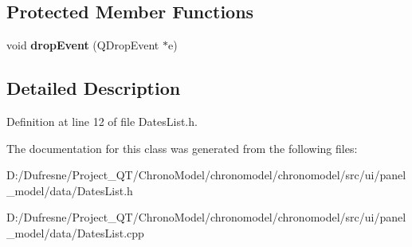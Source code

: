 \subsection*{Protected Member Functions}
\begin{DoxyCompactItemize}
\item 
\hypertarget{class_dates_list_a040e7de759e7da166fc2b3a9a7fef1fc}{void {\bfseries drop\-Event} (Q\-Drop\-Event $\ast$e)}\label{class_dates_list_a040e7de759e7da166fc2b3a9a7fef1fc}

\end{DoxyCompactItemize}


\subsection{Detailed Description}


Definition at line 12 of file Dates\-List.\-h.



The documentation for this class was generated from the following files\-:\begin{DoxyCompactItemize}
\item 
D\-:/\-Dufresne/\-Project\-\_\-\-Q\-T/\-Chrono\-Model/chronomodel/chronomodel/src/ui/panel\-\_\-model/data/Dates\-List.\-h\item 
D\-:/\-Dufresne/\-Project\-\_\-\-Q\-T/\-Chrono\-Model/chronomodel/chronomodel/src/ui/panel\-\_\-model/data/Dates\-List.\-cpp\end{DoxyCompactItemize}
